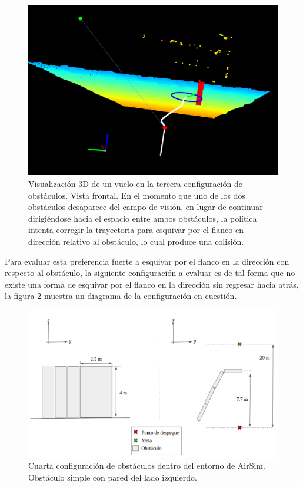 \begin{figure}[H]
    \centering
    \includegraphics[scale=0.32]{partes/ImgJoao/depth-parallel-5-front-collision.png}
    \caption[Visualización 3D de un vuelo en la tercera configuración de obstáculos. Vista frontal. Colisión.]{Visualización 3D de un vuelo en la tercera configuración de obstáculos. Vista frontal. En el momento que uno de los dos obstáculos desaparece del campo de visión, en lugar de continuar dirigiéndose hacia el espacio entre ambos obstáculos, la política intenta corregir la trayectoria para esquivar por el flanco en dirección  relativo al obstáculo, lo cual produce una colisión. }
    \label{fig:depth-parallel-5}
\end{figure}


Para evaluar esta preferencia fuerte a esquivar por el flanco en la dirección  con respecto al obstáculo, la siguiente configuración a evaluar es de tal forma que no existe una forma de esquivar por el flanco en la dirección  sin regresar hacia atrás, la figura \ref{fig:config-4-wall} muestra un diagrama de la configuración en cuestión.

\begin{figure}[H]
    \centering
    \includegraphics[scale=0.35]{partes/ImgJoao/config-4-left-wall.png}
    \caption[Cuarta configuración de obstáculos dentro del entorno de AirSim.]{Cuarta configuración de obstáculos dentro del entorno de AirSim. Obstáculo simple con pared del lado izquierdo.}
    \label{fig:config-4-wall}
\end{figure}

